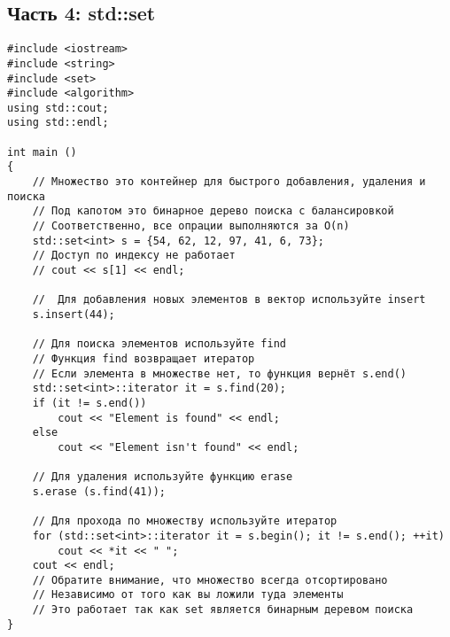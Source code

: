 \documentclass{article}
\begin{document}
\newpage
\subsection*{Часть 4: std::set}
\begin{lstlisting}
#include <iostream>
#include <string>
#include <set>
#include <algorithm>
using std::cout;
using std::endl;

int main () 
{
    // Множество это контейнер для быстрого добавления, удаления и поиска
    // Под капотом это бинарное дерево поиска с балансировкой
    // Соответственно, все опрации выполняются за O(n)
    std::set<int> s = {54, 62, 12, 97, 41, 6, 73};
    // Доступ по индексу не работает
    // cout << s[1] << endl;
    
    //  Для добавления новых элементов в вектор используйте insert
    s.insert(44);
    
    // Для поиска элементов используйте find
    // Функция find возвращает итератор
    // Если элемента в множестве нет, то функция вернёт s.end()
    std::set<int>::iterator it = s.find(20);
    if (it != s.end())
		cout << "Element is found" << endl;
	else
		cout << "Element isn't found" << endl;
		
	// Для удаления используйте функцию erase
    s.erase (s.find(41));

	// Для прохода по множеству используйте итератор
    for (std::set<int>::iterator it = s.begin(); it != s.end(); ++it)
        cout << *it << " ";
    cout << endl;
    // Обратите внимание, что множество всегда отсортировано
    // Независимо от того как вы ложили туда элементы
    // Это работает так как set является бинарным деревом поиска
}
\end{lstlisting}
\end{document}
